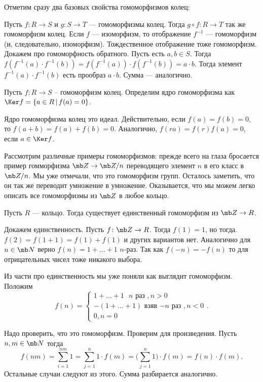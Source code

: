 Отметим сразу два базовых свойства гомоморфизмов колец:

\lm Пусть $f\colon R \to S$  и $g\colon S \to T$ --- гомоморфизмы колец. Тогда $g\circ f\colon R \to T$ так же гомоморфизм
колец. Если $f$ — изоморфизм, то отображение $f^{-1}$ --- гомоморфизм (и, следовательно, изоморфизм). Тождественное
отображение тоже гомоморфизм.
\elm
\proof Докажем про гомоморфность обратного. Пусть есть $a,b \in S$. Тогда $f(f^{-1}(a)\cdot f^{-1}(b))=f(f^{-1}(a))\cdot f(f^{-1}(b))=a\cdot b$. Тогда элемент $f^{-1}(a)\cdot f^{-1}(b)$ есть прообраз $a\cdot b$. Сумма --- аналогично.
\endproof



\dfn Пусть $f\colon R \to S $  -- гомоморфизм колец. Определим ядро гомоморфизма  как $\Ker f=\{ a \in R\,|\, f(a)=0\}$.
\edfn

\rm Ядро гомоморфизма колец это идеал. Действительно, если $f(a)=f(b)=0$, то $f(a+b)=f(a)+f(b)=0$. Аналогично, $f(ra)=f(r)f(a)=0$, если $a\in \Ker f$. 
\erm


Рассмотрим различные примеры гомоморфизмов: прежде всего на  глаза бросается пример гомморфизма $\mb Z\to \mb Z/n$ переводящего элемент $n$ в его класс в $\mb Z/n$. Мы уже отмечали, что это гомоморфизм групп. Осталось заметить, что он так же переводит умножение в умножение. Оказывается, что мы можем легко описать все гомоморфизмы из $\mb Z$ в любое кольцо.


\thrm Пусть $R$ --- кольцо. Тогда существует единственный гомоморфизм из $\mb Z \to R$.
\ethrm

\proof Докажем единственность. Пусть $f\colon \mb Z \to  R$. Тогда $f(1)=1$, но тогда. $f(2)=f(1+1)=f(1)+f(1)$ и других вариантов нет. Аналогично для $n\in \mb N$ верно $f(n)=1+\dots+1$ $n$-раз. Так как $f(-n)=-f(n)$ то для отрицательных чисел тоже никакого выбора.

Из части про единственность мы уже поняли как выглядит гомоморфизм. Положим $$f(n)=\begin{cases}
1+\dots+1 \text{ $n$ раз }, n>0\\
-(1+\dots+1) \text{ взяв $-n$ раз }, n<0\\
0, n=0
\end{cases}.$$

Надо проверить, что это гомоморфизм. Проверим для произведения. Пусть $n,m\in \mb N$ тогда 
$$f(nm)=\sum_{i=1}^{nm} 1= \sum_{j=1}^n 1\cdot f(m)=\Big(\sum_{j=1}^n 1\Big)\cdot f(m)=f(n)\cdot f(m).$$
Остальные случаи следуют из этого. Сумма разбирается аналогично.
\endproof





